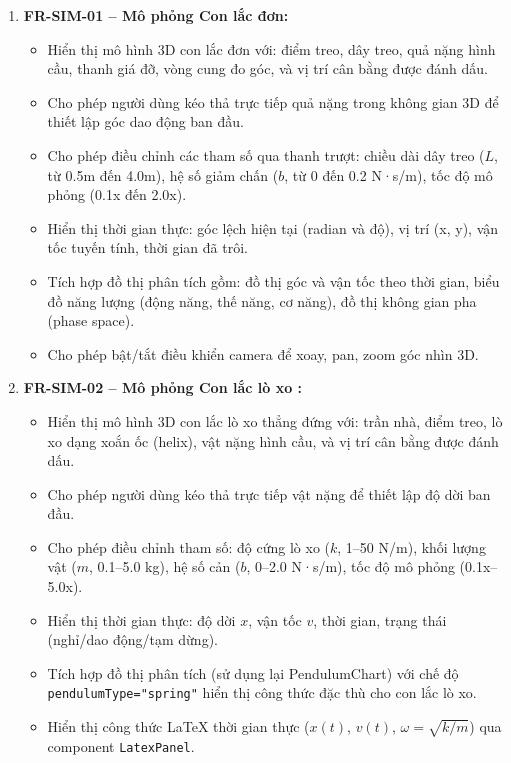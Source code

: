 \begin{enumerate}
    \item \textbf{FR-SIM-01 – Mô phỏng Con lắc đơn:}
    \begin{itemize}
        \item Hiển thị mô hình 3D con lắc đơn với: điểm treo, dây treo, quả nặng hình cầu, thanh giá đỡ, vòng cung đo góc, và vị trí cân bằng được đánh dấu.
        \item Cho phép người dùng kéo thả trực tiếp quả nặng trong không gian 3D để thiết lập góc dao động ban đầu.
        \item Cho phép điều chỉnh các tham số qua thanh trượt: chiều dài dây treo ($L$, từ 0.5m đến 4.0m), hệ số giảm chấn ($b$, từ 0 đến 0.2 N·s/m), tốc độ mô phỏng (0.1x đến 2.0x).
        \item Hiển thị thời gian thực: góc lệch hiện tại (radian và độ), vị trí (x, y), vận tốc tuyến tính, thời gian đã trôi.
        \item Tích hợp đồ thị phân tích  gồm: đồ thị góc và vận tốc theo thời gian, biểu đồ năng lượng (động năng, thế năng, cơ năng), đồ thị không gian pha (phase space).
        \item Cho phép bật/tắt điều khiển camera để xoay, pan, zoom góc nhìn 3D.
    \end{itemize}
    
    \item \textbf{FR-SIM-02 – Mô phỏng Con lắc lò xo :}
    \begin{itemize}
        \item Hiển thị mô hình 3D con lắc lò xo thẳng đứng với: trần nhà, điểm treo, lò xo dạng xoắn ốc (helix), vật nặng hình cầu, và vị trí cân bằng được đánh dấu.
        \item Cho phép người dùng kéo thả trực tiếp vật nặng để thiết lập độ dời ban đầu.
        \item Cho phép điều chỉnh tham số: độ cứng lò xo ($k$, 1–50 N/m), khối lượng vật ($m$, 0.1–5.0 kg), hệ số cản ($b$, 0–2.0 N·s/m), tốc độ mô phỏng (0.1x–5.0x).
        \item Hiển thị thời gian thực: độ dời $x$, vận tốc $v$, thời gian, trạng thái (nghỉ/dao động/tạm dừng).
        \item Tích hợp đồ thị phân tích (sử dụng lại PendulumChart) với chế độ \texttt{pendulumType="spring"} hiển thị công thức đặc thù cho con lắc lò xo.
        \item Hiển thị công thức LaTeX thời gian thực ($x(t)$, $v(t)$, $\omega = \sqrt{k/m}$) qua component \texttt{LatexPanel}.
    \end{itemize}
    

\end{enumerate}

